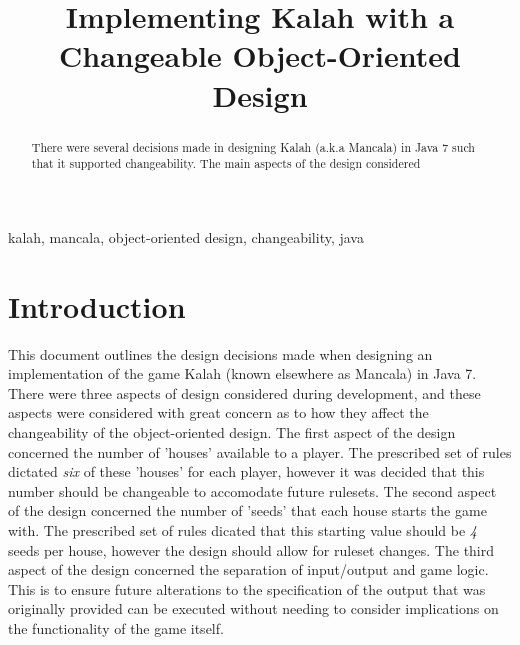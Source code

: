 \documentclass[10pt, a4paper, conference]{IEEEtran}
\begin{document}
\title{Implementing Kalah with a Changeable Object-Oriented Design\\
}

\author{
}

\maketitle

\begin{abstract}
There were several decisions made in designing Kalah (a.k.a Mancala) in Java
  7 such that it supported changeability. The main aspects of the design
    considered 
\end{abstract}

\begin{IEEEkeywords}
kalah, mancala, object-oriented design, changeability, java
\end{IEEEkeywords}

\section{Introduction}
This document outlines the design decisions made when designing an
implementation of the game Kalah (known elsewhere as Mancala) in Java 7.
There were three aspects of design considered during development, and these
  aspects were considered with great concern as to how they affect the
  changeability of the object-oriented design.
The first aspect of the design concerned the number of 'houses' available to
  a player. The prescribed set of rules dictated \textit{six} of these 'houses'
  for each player, however it was decided that this number should be
  changeable to accomodate future rulesets.
The second aspect of the design concerned the number of 'seeds' that each house
  starts the game with. The prescribed set of rules dicated that this starting
  value should be \textit{4} seeds per house, however the design should allow
  for ruleset changes.
The third aspect of the design concerned the separation of input/output and
game logic. This is to ensure future alterations to the specification of the
output that was originally provided can be executed without needing to consider
implications on the functionality of the game itself.
\end{document}
